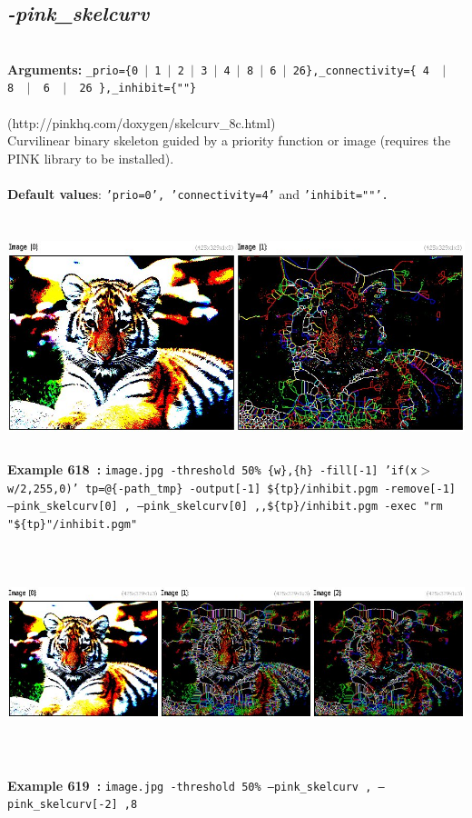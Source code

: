 \documentclass[a4paper,11pt,twoside]{book}
\begin{document}
\subsection{\emph{-pink\_skelcurv} }\vspace*{-0.5em}
~\\\textbf{Arguments: } 
{\small \texttt{\_prio=\{0~$|$~1~$|$~2~$|$~3~$|$~4~$|$~8~$|$~6~$|$~26\},\_connectivity=\{ 4 ~$|$~ 8 ~$|$~ 6 ~$|$~ 26 \},\_inhibit=\{""\}}}\\~\\
(http://pinkhq.com/doxygen/skelcurv\_8c.html)
~\\Curvilinear binary skeleton guided by a priority function or image (requires the PINK library to be installed).
~\\~\\\textbf{Default values}: {\small \texttt{'prio=0', 'connectivity=4'} and \texttt{'inhibit=""'.}}
\begin{center}\includegraphics[keepaspectratio=true,height=7cm,width=\textwidth]{img/gmic_def618.jpg}\\
{\footnotesize \textbf{Example 618~:} \texttt{image.jpg -threshold 50\% \{w\},\{h\} -fill[-1] 'if(x$>$w/2,255,0)' tp=@\{-path\_tmp\} -output[-1] \$\{tp\}/inhibit.pgm -remove[-1] --pink\_skelcurv[0] , --pink\_skelcurv[0] ,,\$\{tp\}/inhibit.pgm -exec "rm "\$\{tp\}"/inhibit.pgm"}}
\\\includegraphics[keepaspectratio=true,height=7cm,width=\textwidth]{img/gmic_def619.jpg}\\
{\footnotesize \textbf{Example 619~:} \texttt{image.jpg -threshold 50\% --pink\_skelcurv , --pink\_skelcurv[-2] ,8}}
\end{center}
\end{document}
